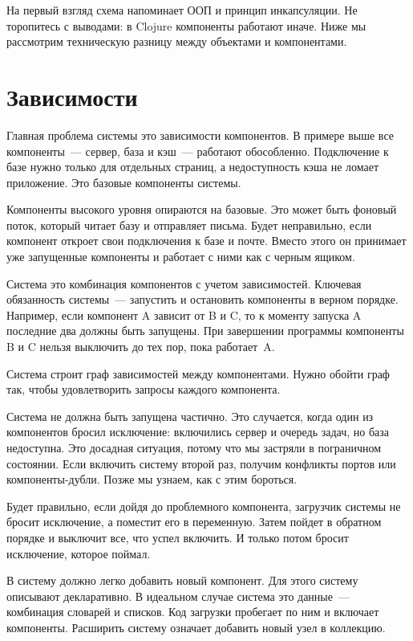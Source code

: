На первый взгляд схема напоминает ООП и принцип инкапсуляции. Не торопитесь с
выводами: в Clojure компоненты работают иначе. Ниже мы рассмотрим техническую
разницу между объектами и компонентами.

\section{Зависимости}

Главная проблема системы это зависимости компонентов. В примере выше все
компоненты~--- сервер, база и кэш~--- работают обособленно. Подключение к базе
нужно только для отдельных страниц, а недоступность кэша не ломает
приложение. Это базовые компоненты системы.

Компоненты высокого уровня опираются на базовые. Это может быть фоновый поток,
который читает базу и отправляет письма. Будет неправильно, если компонент
откроет свои подключения к базе и почте. Вместо этого он принимает уже
запущенные компоненты и работает с ними как с черным ящиком.

Система это комбинация компонентов с учетом зависимостей. Ключевая обязанность
системы~--- запустить и остановить компоненты в верном порядке. Например, если
компонент A зависит от B и C, то к моменту запуска A последние два должны быть
запущены. При завершении программы компоненты B и C нельзя выключить до тех пор,
пока работает~A.

Система строит граф зависимостей между компонентами. Нужно обойти граф так,
чтобы удовлетворить запросы каждого компонента.

Система не должна быть запущена частично. Это случается, когда один из
компонентов бросил исключение: включились сервер и очередь задач, но база
недоступна. Это досадная ситуация, потому что мы застряли в пограничном
состоянии. Если включить систему второй раз, получим конфликты портов или
компоненты-дубли. Позже мы узнаем, как с этим бороться.

Будет правильно, если дойдя до проблемного компонента, загрузчик системы не
бросит исключение, а поместит его в переменную. Затем пойдет в обратном порядке
и выключит все, что успел включить. И только потом бросит исключение, которое
поймал.

В систему должно легко добавить новый компонент. Для этого систему описывают
декларативно. В идеальном случае система это данные~--- комбинация словарей и
списков. Код загрузки пробегает по ним и включает компоненты. Расширить систему
означает добавить новый узел в коллекцию.

